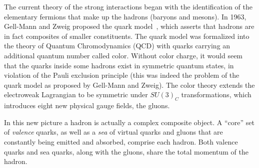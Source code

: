 The current theory of the strong interactions began with the identification of the elementary fermions that make up the hadrons (baryons and mesons). In 1963, Gell-Mann and Zweig proposed the quark model~\cite{GellMann1964214,Zweig:1964jf,Zweig2}, which asserts that hadrons are in fact composites of smaller constituents.  
The quark model was formalized into the theory of Quantum Chromodynamics (QCD)  %
with quarks carrying an additional quantum number called color.  Without color charge, it would seem that the quarks inside some hadrons exist in symmetric quantum states, in violation of the Pauli exclusion principle (this was indeed the problem of the quark model as proposed by Gell-Mann and Zweig). The color theory extends the electroweak Lagrangian to be symmetric under $SU(3)_C$ transformations, which introduces eight new physical gauge fields, the gluons. 

In this new picture a hadron is actually a complex composite object. A ``core'' set of \emph{valence} quarks, as well as a \emph{sea} of virtual quarks and gluons that are constantly being emitted and absorbed, comprise each hadron.  %
Both valence quarks and sea quarks, along with the gluons, share the total momentum of the hadron.


